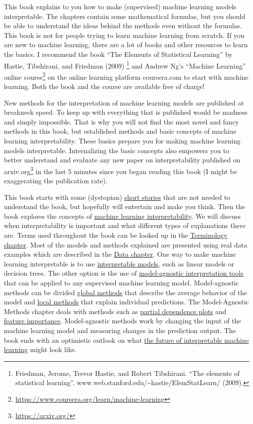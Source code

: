 \documentclass[
  12pt,
]{krantz}
\renewcommand{\href}[2]{#2\footnote{\url{#1}}}
\begin{document}
This book explains to you how to make (supervised) machine learning models interpretable.
The chapters contain some mathematical formulas, but you should be able to understand the ideas behind the methods even without the formulas.
This book is not for people trying to learn machine learning from scratch.
If you are new to machine learning, there are a lot of books and other resources to learn the basics.
I recommend the book ``The Elements of Statistical Learning'' by Hastie, Tibshirani, and Friedman (2009) \footnote{Friedman, Jerome, Trevor Hastie, and Robert Tibshirani. ``The elements of statistical learning''. www.web.stanford.edu/\textasciitilde hastie/ElemStatLearn/ (2009).} and \href{https://www.coursera.org/learn/machine-learning}{Andrew Ng's ``Machine Learning'' online course} on the online learning platform coursera.com to start with machine learning.
Both the book and the course are available free of charge!

New methods for the interpretation of machine learning models are published at breakneck speed.
To keep up with everything that is published would be madness and simply impossible.
That is why you will not find the most novel and fancy methods in this book, but established methods and basic concepts of machine learning interpretability.
These basics prepare you for making machine learning models interpretable.
Internalizing the basic concepts also empowers you to better understand and evaluate any new paper on interpretability published on \href{https://arxiv.org/}{arxiv.org} in the last 5 minutes since you began reading this book (I might be exaggerating the publication rate).

This book starts with some (dystopian) \protect\hyperlink{storytime}{short stories} that are not needed to understand the book, but hopefully will entertain and make you think.
Then the book explores the concepts of \protect\hyperlink{interpretability}{machine learning interpretability}.
We will discuss when interpretability is important and what different types of explanations there are.
Terms used throughout the book can be looked up in the \protect\hyperlink{terminology}{Terminology chapter}.
Most of the models and methods explained are presented using real data examples which are described in the \protect\hyperlink{data}{Data chapter}.
One way to make machine learning interpretable is to use \protect\hyperlink{simple}{interpretable models}, such as linear models or decision trees.
The other option is the use of \protect\hyperlink{agnostic}{model-agnostic interpretation tools} that can be applied to any supervised machine learning model.
Model-agnostic methods can be divided \protect\hyperlink{global-methods}{global methods} that describe the average behavior of the model and \protect\hyperlink{local-methods}{local methods} that explain individual predictions.
The Model-Agnostic Methods chapter deals with methods such as \protect\hyperlink{pdp}{partial dependence plots} and \protect\hyperlink{feature-importance}{feature importance}.
Model-agnostic methods work by changing the input of the machine learning model and measuring changes in the prediction output.
The book ends with an optimistic outlook on what \protect\hyperlink{future}{the future of interpretable machine learning} might look like.
\end{document}
